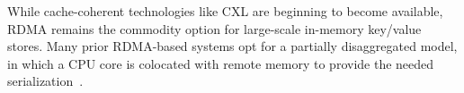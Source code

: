 While cache-coherent technologies like CXL are beginning to
become available, RDMA remains the commodity option for
large-scale in-memory key/value stores.
%
Many prior RDMA-based systems opt for a partially
disaggregated model, in which a CPU core is colocated with
remote memory to provide the needed
serialization~\cite{erpc,herd,pilaf,cell,clover}.
%
